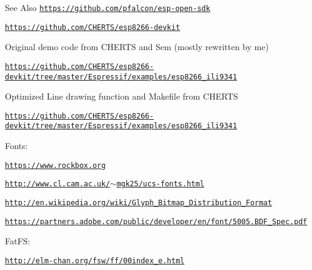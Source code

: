 \begin{DoxySeeAlso}{See Also}
\href{https://github.com/pfalcon/esp-open-sdk}{\tt https\-://github.\-com/pfalcon/esp-\/open-\/sdk} 

\href{https://github.com/CHERTS/esp8266-devkit}{\tt https\-://github.\-com/\-C\-H\-E\-R\-T\-S/esp8266-\/devkit}
\begin{DoxyItemize}
\item Original demo code from C\-H\-E\-R\-T\-S and Sem (mostly rewritten by me) 
\end{DoxyItemize}

\href{https://github.com/CHERTS/esp8266-devkit/tree/master/Espressif/examples/esp8266_ili9341}{\tt https\-://github.\-com/\-C\-H\-E\-R\-T\-S/esp8266-\/devkit/tree/master/\-Espressif/examples/esp8266\-\_\-ili9341}
\begin{DoxyItemize}
\item Optimized Line drawing function and Makefile from C\-H\-E\-R\-T\-S 
\end{DoxyItemize}

\href{https://github.com/CHERTS/esp8266-devkit/tree/master/Espressif/examples/esp8266_ili9341}{\tt https\-://github.\-com/\-C\-H\-E\-R\-T\-S/esp8266-\/devkit/tree/master/\-Espressif/examples/esp8266\-\_\-ili9341}
\begin{DoxyItemize}
\item Fonts\-: 
\end{DoxyItemize}

\href{https://www.rockbox.org}{\tt https\-://www.\-rockbox.\-org} 

\href{http://www.cl.cam.ac.uk/~mgk25/ucs-fonts.html}{\tt http\-://www.\-cl.\-cam.\-ac.\-uk/$\sim$mgk25/ucs-\/fonts.\-html} 

\href{http://en.wikipedia.org/wiki/Glyph_Bitmap_Distribution_Format}{\tt http\-://en.\-wikipedia.\-org/wiki/\-Glyph\-\_\-\-Bitmap\-\_\-\-Distribution\-\_\-\-Format} 

\href{https://partners.adobe.com/public/developer/en/font/5005.BDF_Spec.pdf}{\tt https\-://partners.\-adobe.\-com/public/developer/en/font/5005.\-B\-D\-F\-\_\-\-Spec.\-pdf}
\begin{DoxyItemize}
\item Fat\-F\-S\-: 
\end{DoxyItemize}

\href{http://elm-chan.org/fsw/ff/00index_e.html}{\tt http\-://elm-\/chan.\-org/fsw/ff/00index\-\_\-e.\-html} 


\end{DoxySeeAlso}
